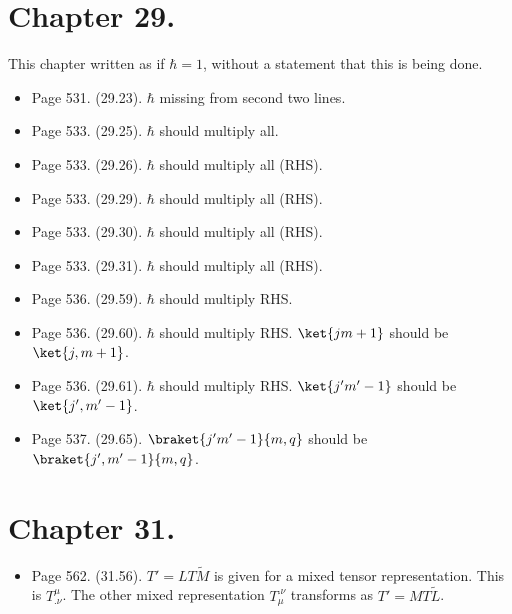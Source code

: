 \section{Chapter 29.}
This chapter written as if $\hbar = 1$, without a statement that this is being done.
\begin{itemize}
\item Page 531.  (29.23).  $\hbar$ missing from second two lines.
\item Page 533.  (29.25).  $\hbar$ should multiply all.
\item Page 533.  (29.26).  $\hbar$ should multiply all (RHS).
\item Page 533.  (29.29).  $\hbar$ should multiply all (RHS).
\item Page 533.  (29.30).  $\hbar$ should multiply all (RHS).
\item Page 533.  (29.31).  $\hbar$ should multiply all (RHS).
\item Page 536.  (29.59).  $\hbar$ should multiply RHS.
\item Page 536.  (29.60).  $\hbar$ should multiply RHS.  $\ket{j m + 1}$ should be $\ket{j, m+1}$.
\item Page 536.  (29.61).  $\hbar$ should multiply RHS.  $\ket{j'm' - 1}$ should be $\ket{j', m'-1}$.
\item Page 537.  (29.65).  $\braket{j'm' - 1}{m, q}$ should be $\braket{j', m'-1}{m, q}$.
\end{itemize}

\section{Chapter 31.}
\begin{itemize}
\item Page 562.  (31.56).  $T' = L T \tilde{M}$ is given for a mixed tensor representation.  This is $T^\mu_{.\nu}$.  The other mixed representation $T_{\mu}^{.\nu}$ transforms as $T' = M T \tilde{L}$.
\end{itemize}


